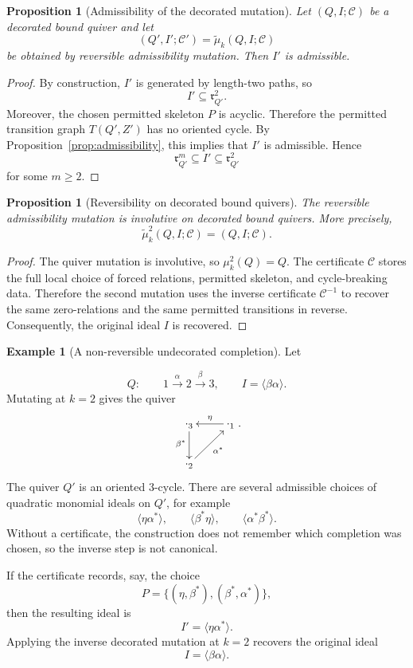 \documentclass[11pt]{article}
\newcommand{\rad}{\mathfrak r}
\theoremstyle{plain}
\newtheorem{proposition}[theorem]{Proposition}
\theoremstyle{definition}
\newtheorem{example}[theorem]{Example}
\theoremstyle{remark}
\begin{document}
\begin{proposition}[Admissibility of the decorated mutation]\label{prop:decorated-admissibility}
Let \((Q,I;\mathcal C)\) be a decorated bound quiver and let
\[
(Q',I';\mathcal C')=\widetilde{\mu}_k(Q,I;\mathcal C)
\]
be obtained by reversible admissibility mutation.  Then \(I'\) is admissible.
\end{proposition}

\begin{proof}
By construction, \(I'\) is generated by length-two paths, so
\[
I'\subseteq \rad_{Q'}^2.
\]
Moreover, the chosen permitted skeleton \(P\) is acyclic.  Therefore the
permitted transition graph \(T(Q',Z')\) has no oriented cycle.  By
Proposition~\ref{prop:admissibility}, this implies that \(I'\) is admissible.
Hence
\[
\rad_{Q'}^m\subseteq I'\subseteq \rad_{Q'}^2
\]
for some \(m\geq 2\).
\end{proof}

\begin{proposition}[Reversibility on decorated bound quivers]\label{prop:decorated-admissibility-reversible}
The reversible admissibility mutation is involutive on decorated bound quivers.
More precisely,
\[
\widetilde{\mu}_k^2(Q,I;\mathcal C)=(Q,I;\mathcal C).
\]
\end{proposition}

\begin{proof}
The quiver mutation is involutive, so \(\mu_k^2(Q)=Q\).  The certificate
\(\mathcal C\) stores the full local choice of forced relations, permitted
skeleton, and cycle-breaking data.  Therefore the second mutation uses the
inverse certificate \(\mathcal C^{-1}\) to recover the same zero-relations and
the same permitted transitions in reverse.  Consequently, the original ideal
\(I\) is recovered.
\end{proof}

\begin{example}[A non-reversible undecorated completion]
Let



\[
Q:\qquad 1\xrightarrow{\alpha}2\xrightarrow{\beta}3,
\qquad
I=\langle \beta\alpha\rangle.
\]
Mutating at \(k=2\) gives the quiver
\begin{equation}\label{}
\nonumber   \xymatrix{
\cdot_{3} \ar[d]_{\beta^*} & \ar[l]_{\eta}\cdot_{1} \\
	\cdot_{2}  \ar[ur]_{\alpha^*}}.
  \end{equation}
The quiver \(Q'\) is an oriented \(3\)-cycle.  There are several admissible
choices of quadratic monomial ideals on \(Q'\), for example
\[
\langle \eta\alpha^*\rangle,\qquad
\langle \beta^*\eta\rangle,\qquad
\langle \alpha^*\beta^*\rangle.
\]
Without a certificate, the construction does not remember which completion was
chosen, so the inverse step is not canonical.

If the certificate records, say, the choice
\[
P=\{(\eta,\beta^*),(\beta^*,\alpha^*)\},
\]
then the resulting ideal is
\[
I'=\langle \eta\alpha^*\rangle.
\]
Applying the inverse decorated mutation at \(k=2\) recovers the original ideal
\[
I=\langle \beta\alpha\rangle.
\]
\end{example}
\end{document}
